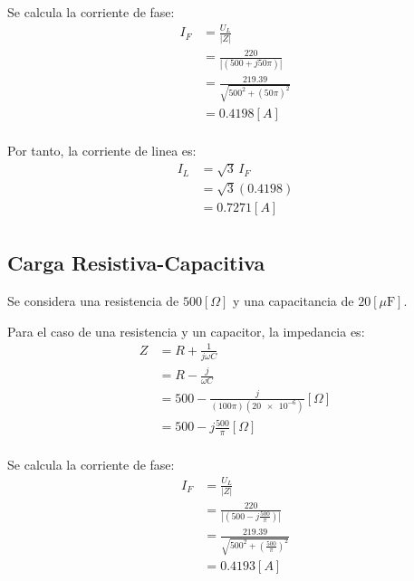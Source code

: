 \documentclass[letter,11pt]{article}
\begin{document}
Se calcula la corriente de fase:
\begin{equation*}
    \begin{split}
        I_F&=\frac{U_L}{|Z|}\\
           &=\frac{220}{|(500+j50\pi)|}\\
           &=\frac{219.39}{\sqrt{500^2+(50\pi)^2}}\\
           &=0.4198[A]\\
    \end{split}
\end{equation*}

Por tanto, la corriente de linea es:
\begin{equation*}
    \begin{split}
        I_L&=\sqrt{3}\,I_F\\
           &=\sqrt{3}(0.4198)\\
           &=0.7271[A]\\
    \end{split}
\end{equation*}

\subsection{Carga Resistiva-Capacitiva}
Se considera una resistencia de $500[\Omega]$ y una capacitancia de
$20[\mu\text{F}]$.

Para el caso de una resistencia y un capacitor, la impedancia es:
\begin{equation*}
    \begin{split}
        Z&=R+\frac{1}{j\omega C}\\
         &=R-\frac{j}{\omega C}\\
         &=500-\frac{j}{(100\pi)(\num{20e-6})}[\Omega]\\
         &=500-j\frac{500}{\pi}[\Omega]\\
    \end{split}
\end{equation*}

Se calcula la corriente de fase:
\begin{equation*}
    \begin{split}
        I_F&=\frac{U_L}{|Z|}\\
           &=\frac{220}{|(500-j\frac{500}{\pi})|}\\
           &=\frac{219.39}{\sqrt{500^2+(\frac{500}{\pi})^2}}\\
           &=0.4193[A]\\
    \end{split}
\end{equation*}
\end{document}
